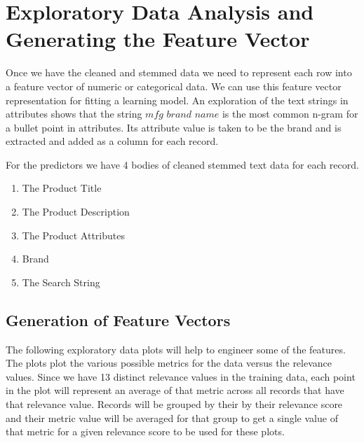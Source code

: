 \documentclass[twoside,12pt]{article}
\begin{document}
\section{Exploratory Data Analysis and Generating the Feature Vector}
\label{exploratory}
Once we have the cleaned and stemmed data we need to represent each row into a feature vector of numeric or categorical data. We can use this feature vector representation for fitting a learning model.  An exploration of the text strings in attributes shows that the string $\textit{mfg brand name}$ is the most common n-gram for a bullet point in attributes. Its attribute value is taken to be the brand and is extracted and added as a column for each record.
	
For the predictors we have 4 bodies of cleaned stemmed text data for each record.
\begin{enumerate}
		\item 
		The Product Title
		\item
		The Product Description
		\item
		The Product Attributes
		\item
		Brand
		\item
		The Search String
\end{enumerate}

\subsection{Generation of Feature Vectors}
\label{feature_vectors}
The following exploratory data plots will help to engineer some of the features. The plots plot the various possible metrics for the data versus the relevance values. Since we have 13 distinct relevance values in the training data, each point in the plot will represent an average of that metric across all records that have that relevance value. Records will be grouped by their by their relevance score and their metric value will be averaged for that group to get a single value of that metric for a given relevance score to be used for these plots.
\end{document}
